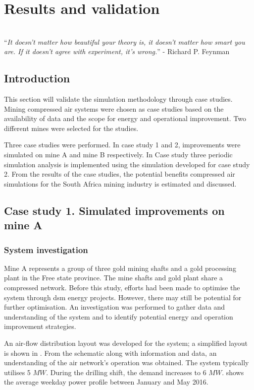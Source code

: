 \chapter{Results and validation}
\thispagestyle{empty}
\vspace{38em}
\hrulefill
\\

\enquote{\textit{It doesn't matter how beautiful your theory is, it doesn't matter how smart you are. If it doesn't agree with experiment, it's wrong.}} - Richard P. Feynman\\
\newpage
\section{Introduction}
This section will validate the simulation methodology through case studies. Mining compressed air systems were chosen as case studies based on the availability of data and the scope for energy and operational improvement. Two different mines were selected for the studies. 
\par 
Three case studies were performed. In case study 1 and 2, improvements were simulated on mine A and mine B respectively. In Case study three periodic simulation analysis is implemented using the simulation developed for case study 2. From the results of the case studies, the potential benefits compressed air simulations for the South Africa mining industry is estimated and discussed.

\section{Case study 1. Simulated improvements on mine A}
\subsection{System investigation}
Mine A represents a group of three gold mining shafts and a gold processing plant in the Free state province. The mine shafts and gold plant share a compressed network. Before this study, efforts had been made to optimise the system through \gls{dsm} energy projects. However, there may still be potential for further optimisation. An investigation was performed to gather data and understanding of the system and to identify potential energy and operation improvement strategies.
\par 
An air-flow distribution layout was developed for the system; a simplified layout is shown in . From the schematic along with information and data, an understanding of the air network’s operation was obtained. The system typically utilises 5 $MW$. During the drilling shift, the demand increases to 6 $MW$.  shows the average weekday power profile between January and May 2016.

